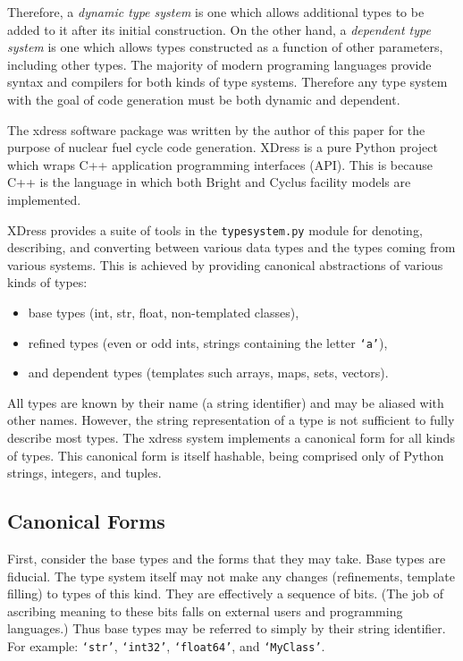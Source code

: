 \documentclass{ansconfpaper}
\newcommand{\vin}[1]{\texttt{{#1}}}
\begin{document}
Therefore, a \emph{dynamic type system} is one which allows additional types to 
be added to it after its initial construction.  On the other hand, a \emph{dependent 
type system} is one which allows types constructed as a function of other parameters, 
including other types.  The majority of modern programing languages provide 
syntax and compilers for both kinds of type systems.  Therefore any type system with
the goal of code generation must be both dynamic and dependent.

The xdress software package \cite{xdress} was written by the author of this paper for 
the purpose of nuclear fuel cycle code generation.  XDress is a pure Python 
project which wraps C++ application programming interfaces (API).  This is because
C++ is the language in which both Bright and Cyclus facility models are implemented.

XDress provides a suite of tools in the \vin{typesystem.py} module for denoting, 
describing, and converting
between various data types and the types coming from various systems.  This is
achieved by providing canonical abstractions of various kinds of types:

\begin{itemize}
    \item base types (int, str, float, non-templated classes),
    \item refined types (even or odd ints, strings containing the letter \vin{`a'}),
    \item and dependent types (templates such arrays, maps, sets, vectors).
\end{itemize}

All types are known by their name (a string identifier) and may be aliased with 
other names.  However, the string representation of a type is not sufficient to 
fully describe most types.  The xdress system implements a canonical form for all 
kinds of types.  This canonical form is itself hashable, being comprised only of 
Python strings, integers, and tuples.

\subsection{Canonical Forms}
\label{sec:canon}

First, consider the base types and the forms that they may take.  Base types
are fiducial.  The type system itself may not make any changes (refinements, 
template filling) to types of this kind.  They are effectively a sequence of bits.
(The job of ascribing meaning to these bits falls on external users and programming 
languages.)  Thus base types may be referred to simply by their string identifier.  
For example: \vin{`str'}, \vin{`int32'}, \vin{`float64'}, and \vin{`MyClass'}.
\end{document}
